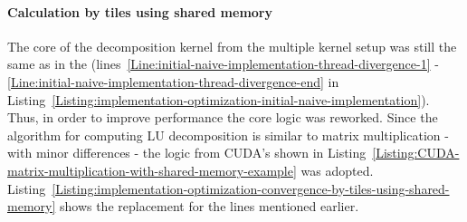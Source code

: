 \paragraph{Calculation by tiles using shared memory}\label{Paragraph:implementation-optimization-calculation-by-tiles-using-shared-memory}
The core of the decomposition kernel from the multiple kernel setup was still the same as in the \textit{} (lines~\ref{Line:initial-naive-implementation-thread-divergence-1} - \ref{Line:initial-naive-implementation-thread-divergence-end} in Listing~\ref{Listing:implementation-optimization-initial-naive-implementation}). Thus, in order to improve performance the core logic was reworked. Since the algorithm for computing LU decomposition is similar to matrix multiplication - with minor differences - the logic from CUDA's \textit{} shown in Listing~\ref{Listing:CUDA-matrix-multiplication-with-shared-memory-example} was adopted. Listing~\ref{Listing:implementation-optimization-convergence-by-tiles-using-shared-memory} shows the replacement for the lines mentioned earlier.

